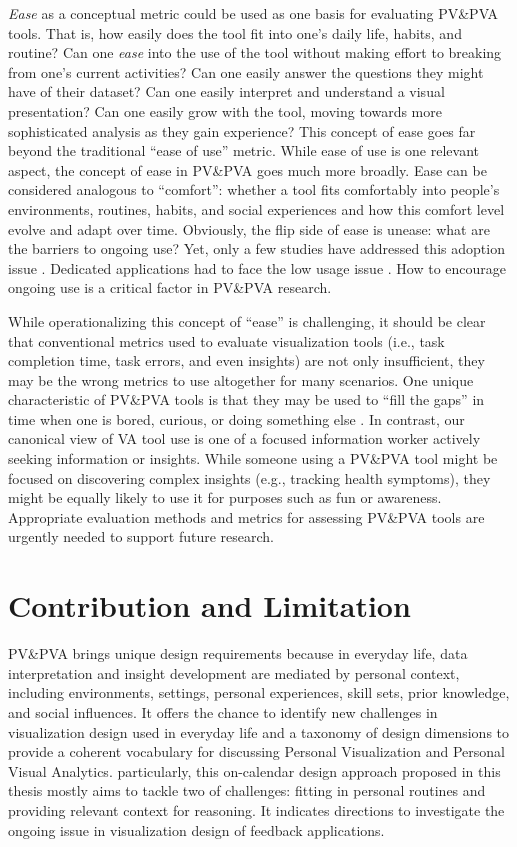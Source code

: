 \documentclass[12pt,oneside]{book}
\begin{document}
\textit{Ease} as a conceptual metric could be used as one basis for evaluating PV\&PVA tools. That is, how easily does the tool fit into one's daily life, habits, and routine?  Can one \textit{ease} into the use of the tool without making effort to breaking from one's current activities? Can one easily answer the questions they might have of their dataset? Can one easily interpret and understand a visual presentation? Can one easily grow with the tool, moving towards more sophisticated analysis as they gain experience? This concept of ease goes far beyond the traditional ``ease of use'' metric. While ease of use is one relevant aspect, the concept of ease in PV\&PVA goes much more broadly. Ease can be considered analogous to ``comfort'': whether a tool fits comfortably into people's environments, routines, habits, and social experiences and how this comfort level evolve and adapt over time.  Obviously, the flip side of ease is unease: what are the barriers to ongoing use?  Yet, only a few studies have addressed this adoption issue \cite{grammel_how_2010,ko_six_2004}.  Dedicated applications had to face the low usage issue \cite{bartram_design_2015,karapanos_user_2009,erickson_dubuque_2013, thudt_visual_2015}.  How to encourage ongoing use is a critical factor in PV\&PVA research.

While operationalizing this concept of ``ease'' is challenging, it should be clear that conventional metrics used to evaluate visualization tools (i.e., task completion time, task errors, and even insights) are not only insufficient, they may be the wrong metrics to use altogether for many scenarios. One unique characteristic of PV\&PVA tools is that they may be used to ``fill the gaps'' in time when one is bored, curious, or doing something else \cite{thiry_authoring_2013}.  In contrast, our canonical view of VA tool use is one of a focused information worker actively seeking information or insights.  While someone using a PV\&PVA tool might be focused on discovering complex insights (e.g., tracking health symptoms), they might be equally likely to use it for purposes such as fun or awareness. Appropriate evaluation methods and metrics for assessing PV\&PVA tools are urgently needed to support future research.

\section{Contribution and Limitation}
PV\&PVA brings unique design requirements because in everyday life, data interpretation and insight development are mediated by personal context, including environments, settings, personal experiences, skill sets, prior knowledge, and social influences.  It offers the chance to identify new challenges in visualization design used in everyday life and a taxonomy of design dimensions to provide a coherent vocabulary for discussing Personal Visualization and Personal Visual Analytics. particularly, this on-calendar design approach proposed in this thesis mostly aims to tackle two of challenges: fitting in personal routines and providing relevant context for reasoning.  It indicates directions to investigate the ongoing issue in visualization design of feedback applications.
\end{document}
